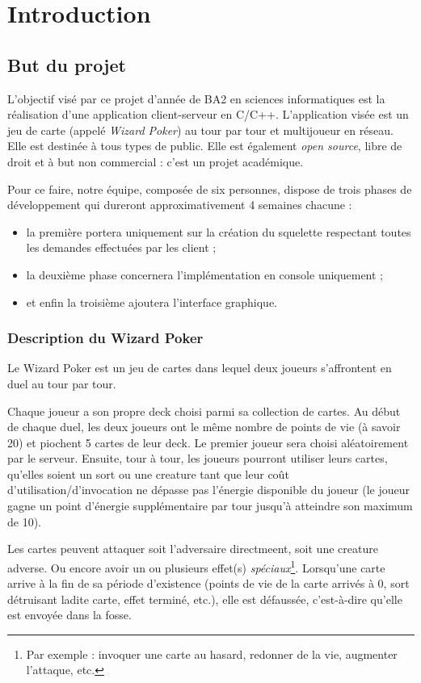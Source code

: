 \documentclass[12pt]{article}
\begin{document}
\tableofcontents
\newpage
{}

\section{Introduction}
	\subsection{But du projet}
		L'objectif visé par ce projet d'année de BA2 en sciences informatiques est la réalisation d'une application client-serveur en C/C++. L'application visée est
		un jeu de carte (appelé \textit{Wizard Poker}) au tour par tour et multijoueur en réseau. Elle est destinée à tous types de public. Elle est également
		\textit{open source}, libre de droit et à but non commercial : c'est un projet académique.

		Pour ce faire, notre équipe, composée de six personnes, dispose de trois phases de développement qui dureront approximativement 4 semaines chacune :
		\begin{itemize}
			\item la première portera uniquement sur la création du squelette respectant toutes les demandes effectuées par les client ;
			\item la deuxième phase concernera l'implémentation en console uniquement ;
			\item et enfin la troisième ajoutera l'interface graphique.
		\end{itemize}

		\subsubsection{Description du Wizard Poker}
			Le Wizard Poker est un jeu de cartes dans lequel deux joueurs s'affrontent en \gls{duel} au tour par tour.
			
			Chaque joueur a son propre \gls{deck} choisi parmi sa collection de cartes. Au début de chaque \gls{duel}, les deux joueurs ont le même nombre de points de vie (à savoir 20) et piochent 5 cartes de leur \gls{deck}.
			Le premier joueur sera choisi aléatoirement par le serveur. Ensuite, tour à tour, les joueurs pourront utiliser leurs cartes, qu'elles soient un \gls{sort} ou une \gls{creature} tant que leur coût d'utilisation/d'invocation ne dépasse pas l'énergie disponible du joueur (le joueur gagne un point d'énergie supplémentaire par tour jusqu'à atteindre son maximum de 10).
			
			Les cartes peuvent attaquer soit l'adversaire directmeent, soit une \gls{creature} adverse. Ou encore avoir un ou plusieurs effet(s) \textit{spéciaux}\footnote{Par exemple : \gls{invoquer} une carte au hasard, redonner de la vie, augmenter l'attaque, etc.}. 
			Lorsqu'une carte arrive à la fin de sa période d'existence (points de vie de la carte arrivés à 0, \gls{sort} détruisant ladite carte, effet terminé, etc.), elle est défaussée, c'est-à-dire qu'elle est envoyée dans la \gls{fosse}.
			
\end{document}
